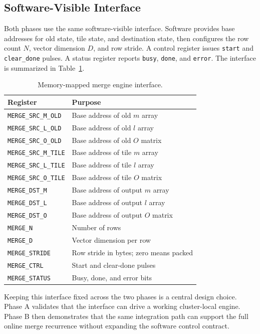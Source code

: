 \documentclass[conference]{IEEEtran}
\begin{document}
\subsection{Software-Visible Interface}

Both phases use the same software-visible interface. Software provides base
addresses for old state, tile state, and destination state, then configures
the row count $N$, vector dimension $D$, and row stride. A control register
issues \texttt{start} and \texttt{clear\_done} pulses. A status register
reports \texttt{busy}, \texttt{done}, and \texttt{error}. The interface is
summarized in Table~\ref{tab:mmio}.

\begin{table}[t]
\centering
\caption{Memory-mapped merge engine interface.}
\label{tab:mmio}
\begin{tabular}{ll}
\toprule
Register & Purpose \\
\midrule
\texttt{MERGE\_SRC\_M\_OLD} & Base address of old $m$ array \\
\texttt{MERGE\_SRC\_L\_OLD} & Base address of old $l$ array \\
\texttt{MERGE\_SRC\_O\_OLD} & Base address of old $O$ matrix \\
\texttt{MERGE\_SRC\_M\_TILE} & Base address of tile $m$ array \\
\texttt{MERGE\_SRC\_L\_TILE} & Base address of tile $l$ array \\
\texttt{MERGE\_SRC\_O\_TILE} & Base address of tile $O$ matrix \\
\texttt{MERGE\_DST\_M} & Base address of output $m$ array \\
\texttt{MERGE\_DST\_L} & Base address of output $l$ array \\
\texttt{MERGE\_DST\_O} & Base address of output $O$ matrix \\
\texttt{MERGE\_N} & Number of rows \\
\texttt{MERGE\_D} & Vector dimension per row \\
\texttt{MERGE\_STRIDE} & Row stride in bytes; zero means packed \\
\texttt{MERGE\_CTRL} & Start and clear-done pulses \\
\texttt{MERGE\_STATUS} & Busy, done, and error bits \\
\bottomrule
\end{tabular}
\end{table}

Keeping this interface fixed across the two phases is a central design choice.
Phase A validates that the interface can drive a working cluster-local engine.
Phase B then demonstrates that the same integration path can support the full
online merge recurrence without expanding the software control contract.
\end{document}

